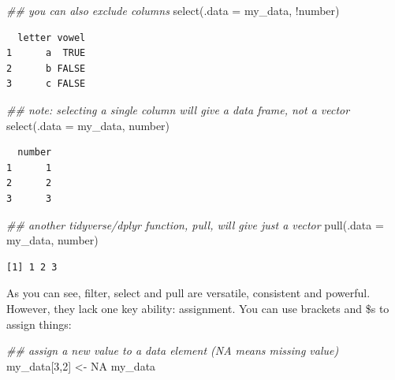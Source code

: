 \documentclass[
  letterpaper,
  DIV=11,
  numbers=noendperiod]{scrreprt}
\newenvironment{Shaded}{\begin{snugshade}}{\end{snugshade}}
\newcommand{\AttributeTok}[1]{\textcolor[rgb]{0.40,0.45,0.13}{#1}}
\newcommand{\ConstantTok}[1]{\textcolor[rgb]{0.56,0.35,0.01}{#1}}
\newcommand{\DecValTok}[1]{\textcolor[rgb]{0.68,0.00,0.00}{#1}}
\newcommand{\DocumentationTok}[1]{\textcolor[rgb]{0.37,0.37,0.37}{\textit{#1}}}
\newcommand{\FunctionTok}[1]{\textcolor[rgb]{0.28,0.35,0.67}{#1}}
\newcommand{\NormalTok}[1]{\textcolor[rgb]{0.00,0.23,0.31}{#1}}
\newcommand{\OtherTok}[1]{\textcolor[rgb]{0.00,0.23,0.31}{#1}}
\newcommand{\SpecialCharTok}[1]{\textcolor[rgb]{0.37,0.37,0.37}{#1}}
\begin{document}
\begin{Shaded}
\begin{Highlighting}[]
\DocumentationTok{\#\# you can also exclude columns}
\FunctionTok{select}\NormalTok{(}\AttributeTok{.data =}\NormalTok{ my\_data, }\SpecialCharTok{!}\NormalTok{number)}
\end{Highlighting}
\end{Shaded}

\begin{verbatim}
  letter vowel
1      a  TRUE
2      b FALSE
3      c FALSE
\end{verbatim}

\begin{Shaded}
\begin{Highlighting}[]
\DocumentationTok{\#\# note: selecting a single column will give a data frame, not a vector}
\FunctionTok{select}\NormalTok{(}\AttributeTok{.data =}\NormalTok{ my\_data, number)}
\end{Highlighting}
\end{Shaded}

\begin{verbatim}
  number
1      1
2      2
3      3
\end{verbatim}

\begin{Shaded}
\begin{Highlighting}[]
\DocumentationTok{\#\# another tidyverse/dplyr function, pull, will give just a vector}
\FunctionTok{pull}\NormalTok{(}\AttributeTok{.data =}\NormalTok{ my\_data, number)}
\end{Highlighting}
\end{Shaded}

\begin{verbatim}
[1] 1 2 3
\end{verbatim}

As you can see, filter, select and pull are versatile, consistent and
powerful. However, they lack one key ability: assignment. You can use
brackets and \$s to assign things:

\begin{Shaded}
\begin{Highlighting}[]
\DocumentationTok{\#\# assign a new value to a data element (NA means missing value)}
\NormalTok{my\_data[}\DecValTok{3}\NormalTok{,}\DecValTok{2}\NormalTok{] }\OtherTok{\textless{}{-}} \ConstantTok{NA}
\NormalTok{my\_data}
\end{Highlighting}
\end{Shaded}
\end{document}
